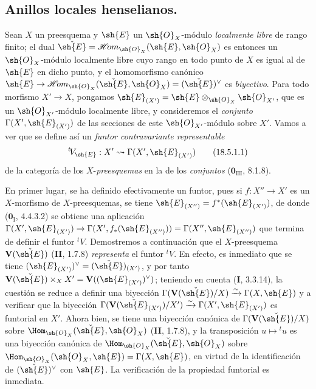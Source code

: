 \subsection{Anillos locales henselianos\texorpdfstring{\protect\footnotemark}{}.}
\label{subsection:IV.18.5}

\begingroup
\newcommand{\shHom}{\mathscr{H}\!om}
\begin{env}[18.5.1]
\label{IV.18.5.1}
Sean $X$ un preesquema y $\sh{E}$ un $\sh{O}_X$-módulo \emph{localmente libre} de rango finito; el dual $\check{\sh{E}}=\shHom_{\sh{O}_X}(\sh{E},\sh{O}_X)$ es entonces un $\sh{O}_X$-módulo localmente libre cuyo rango en todo punto de $X$ es igual al de $\sh{E}$ en dicho punto, y el homomorfismo canónico $\sh{E}\to\shHom_{\sh{O}_X}(\check{\sh{E}},\sh{O}_X)=(\check{\sh{E}})^\vee$ es \emph{biyectivo}. Para todo morfismo $X'\to X$, pongamos $\sh{E}_{(X')}=\sh{E}\otimes_{\sh{O}_X}\sh{O}_{X'}$, que es un $\sh{O}_{X'}$-módulo localmente libre, y consideremos el \emph{conjunto} $\Gamma(X',\sh{E}_{(X')})$ de las secciones de este $\sh{O}_{X'}$-módulo sobre $X'$. Vamos a ver que se define así un \emph{funtor contravariante representable}
\begin{equation}
  {}^t\!V_{\sh{E}}:X'\leadsto\Gamma(X',\sh{E}_{(X')})
  \tag{18.5.1.1}\label{IV.18.5.1.1}
\end{equation}
de la categoría de los $X$-\emph{preesquemas} en la de los \emph{conjuntos} ($\mathbf 0_{\mathrm{III}}$, 8.1.8).

En primer lugar, se ha definido efectivamente un funtor, pues si $f:X''\to X'$ es un $X$-morfismo de $X$-preesquemas, se tiene $\sh{E}_{(X'')}=f^*(\sh{E}_{(X')})$, de donde ($\mathbf 0_{\mathrm I}$, 4.4.3.2) se obtiene una aplicación $\Gamma(X',\sh{E}_{(X')})\to\Gamma(X',f_*(\sh{E}_{(X'')}))=\Gamma(X'',\sh{E}_{(X'')})$ que termina de definir el funtor ${}^t\!V$. Demostremos a continuación que el $X$-preesquema $\mathbf V(\check{\sh{E}})$ (\textbf{II}, 1.7.8) \emph{representa} el funtor ${}^t\!V$. En efecto, es inmediato que se tiene $(\sh{E}_{(X')})^\vee=(\check{\sh{E}})_{(X')}$, y por tanto $\mathbf V(\check{\sh{E}})\times_X X'=\mathbf V((\sh{E}_{(X')})^\vee)$; teniendo en cuenta (\textbf I, 3.3.14), la cuestión se reduce a definir una biyección $\Gamma(\mathbf V(\check{\sh{E}})/X)\xrightarrow{\sim}\Gamma(X,\sh{E})$ y a verificar que la biyección $\Gamma(\mathbf V(\check{\sh{E}}_{(X')})/X')\xrightarrow{\sim}\Gamma(X',\sh{E}_{(X')})$ es funtorial en $X'$. Ahora bien, se tiene una biyección canónica de $\Gamma(\mathbf V(\check{\sh{E}})/X)$ sobre $\Hom_{\sh{O}_X}(\check{\sh{E}},\sh{O}_X)$ (\textbf{II}, 1.7.8), y la transposición $u\mapsto{}^t u$ es una biyección canónica de $\Hom_{\sh{O}_X}(\check{\sh{E}},\sh{O}_X)$ sobre $\Hom_{\sh{O}_X}(\sh{O}_X,\sh{E})=\Gamma(X,\sh{E})$, en virtud de la identificación de $(\check{\sh{E}})^\vee$ con $\sh{E}$. La verificación de la propiedad funtorial es inmediata.
\end{env}
\endgroup

